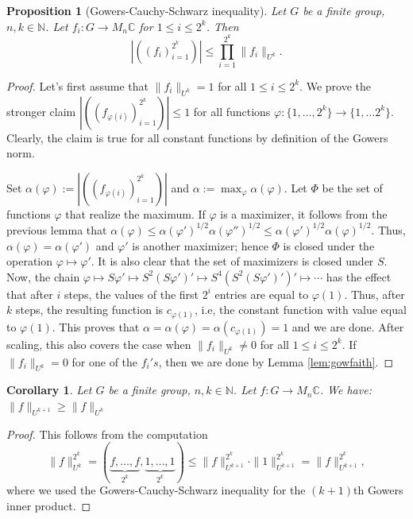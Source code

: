 \documentclass[a4paper,11pt]{amsproc}
\theoremstyle{plain}
\newtheorem{proposition}[theorem]{Proposition}
\newtheorem{corollary}[theorem]{Corollary}
\theoremstyle{definition}
\begin{document}
\begin{proposition}[Gowers-Cauchy-Schwarz inequality] Let $G$ be a finite group, $n,k \in \mathbb N$. Let $f_i \colon G \to M_n \mathbb C$ for $1 \leq i \leq 2^k$. Then
$$|((f_i)_{i=1}^{2^k})| \leq \prod_{i=1}^{2^k} \|f_i\|_{U^k}.$$
\end{proposition}
\begin{proof}
Let's first assume that $\|f_i\|_{U^k} = 1$ for all $1 \leq i \leq 2^k.$ We prove the stronger claim
$|((f_{\varphi(i)})_{i=1}^{2^k})| \leq 1$ for all functions $\varphi \colon \{1,\dots,2^k\} \to \{1,\dots 2^k\}.$ 
Clearly, the claim is true for all constant functions by definition of the Gowers norm.

Set $\alpha(\varphi):=|((f_{\varphi(i)})_{i=1}^{2^k})|$ and $\alpha := \max_{\varphi} \alpha(\varphi).$ Let $\Phi$ be the set of functions $\varphi$ that realize the maximum. If $\varphi$ is a maximizer, it follows from the previous lemma that
$\alpha(\varphi) \leq \alpha(\varphi')^{1/2} \alpha(\varphi'')^{1/2} \leq \alpha(\varphi')^{1/2} \alpha(\varphi)^{1/2}$. Thus, $\alpha(\varphi) = \alpha(\varphi')$ and $\varphi'$ is another maximizer; hence $\Phi$ is closed under the operation $\varphi \mapsto \varphi'$. It is also clear that the set of maximizers is closed under $S$. Now, the chain
$\varphi \mapsto S\varphi' \mapsto S^2(S \varphi')' \mapsto S^4(S^2(S \varphi')')' \mapsto \cdots$
has the effect that after $i$ steps, the values of the first $2^{i}$ entries are equal to $\varphi(1).$ Thus, after $k$ steps, the resulting function is $c_{\varphi(1)}$, i.e, the constant function with value equal to $\varphi(1).$ This proves that
$\alpha = \alpha(\varphi) = \alpha(c_{\varphi(1)})=1$ and we are done. After scaling, this also covers the case when $\|f_i\|_{U^k} \neq 0$ for all $1 \leq i \leq 2^k.$ If $\|f_i\|_{U^k}=0$ for one of the $f_i's$, then we are done by Lemma \ref{lem:gowfaith}.
\end{proof}

\begin{corollary} Let $G$ be a finite group, $n,k \in \mathbb N$. Let $f \colon G \to M_n \mathbb C$. We have:
$\|f\|_{U^{k+1}} \geq \|f\|_{U^k}$
\end{corollary}
\begin{proof} This follows from the computation
$$\|f\|^{2^k}_{U^k} =  (\underbrace{f,\dots,f}_{2^k},\underbrace{1,\dots,1}_{2^k})  \leq \|f\|^{2^k}_{U^{k+1}} \cdot \|1\|^{2^k}_{U^{k+1}} = \|f\|^{2^k}_{U^{k+1}},$$
where we used the Gowers-Cauchy-Schwarz inequality for the $(k+1)$th Gowers inner product.
\end{proof}
\end{document}
